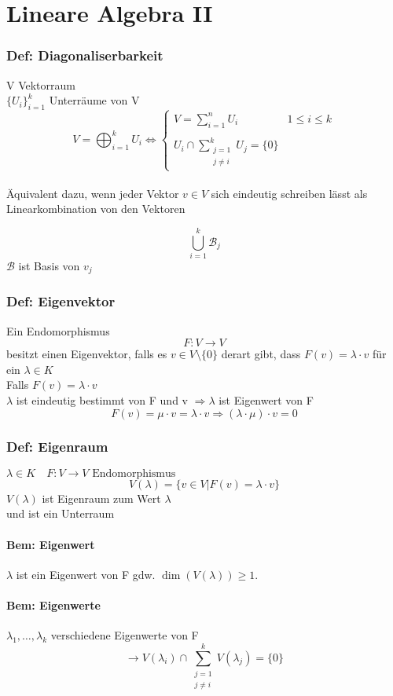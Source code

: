 \documentclass[titlepage,12pt,a4paper,ngerman]{report}
\begin{document}
\chapter{Lineare Algebra II}
\subsection{Def: Diagonaliserbarkeit}
V Vektorraum\\
$\{U_i\}_{i=1}^k$ Unterräume von V
$$ V = \bigoplus_{i=1}^{k} U_{i} \Leftrightarrow \left\{ \begin{array}{ll}
V = \sum_{i=1}^n U_i & 1\le i \le k \\
& \\
U_i \cap \sum\limits_{\substack{j=1\\ j\neq i}}^k U_j = \{0\} & 
\end{array} \right.$$
\\
Äquivalent dazu, wenn jeder Vektor $v\in V$ sich eindeutig schreiben  lässt als Linearkombination von den Vektoren 

$$\bigcup_{i=1}^k \mathcal{B}_j$$
$\mathcal{B}$ ist Basis von $v_j$

\subsection{Def: Eigenvektor} Ein Endomorphismus 
$$F: V\to V$$ besitzt einen Eigenvektor, falls es $v\in V\setminus\{0\}$ derart gibt, dass $F(v)= \lambda \cdot v $ für ein $ \lambda\in K$\\
Falls $F(v) = \lambda \cdot v$ \\
$\lambda$ ist eindeutig bestimmt von F und v $\Rightarrow \lambda$ ist Eigenwert von F
$$F(v) = \mu \cdot v = \lambda \cdot v \Rightarrow (\lambda\cdot \mu) \cdot v = 0$$
\subsection{Def: Eigenraum} $\lambda \in K\quad F: V\to V \textrm{ Endomorphismus}$
$$V(\lambda) = \{ v\in V\vert F(v) = \lambda \cdot v\}$$
$V(\lambda)$ ist Eigenraum zum Wert $\lambda$\\
und ist ein Unterraum
\subsubsection{Bem: Eigenwert}$\lambda$ ist ein Eigenwert von F gdw. $\dim(V(\lambda)) \ge 1$.
\subsubsection{Bem: Eigenwerte} $\lambda_1,\dots , \lambda_k$ verschiedene Eigenwerte von F 
$$\rightarrow V(\lambda_{i}) \cap  \sum_{\substack{j = 1\\j\neq i}}^k V(\lambda_j) = \{0\}$$
\end{document}
